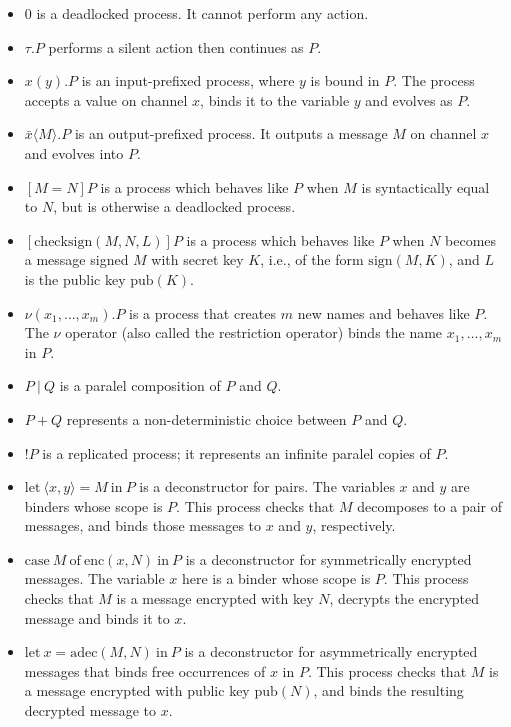 \documentclass{article}
\begin{document}
\begin{itemize}
\item $0$ is a deadlocked process. It cannot perform any action.
\item $\tau.P$ performs a silent action then continues as $P$.
\item $x(y).P$ is an input-prefixed process, where $y$ is bound in $P$.
The process accepts a value on channel $x$, binds it to the
variable $y$ and evolves as $P$.
\item $\bar x\langle M \rangle.P$ is an output-prefixed process. It outputs a message $M$ on channel $x$
and evolves into $P$.
\item $[M = N] P$ is a process which behaves like $P$ when $M$ is syntactically equal to $N$,
but is otherwise a deadlocked process.
\item $[\mathrm{checksign}(M, N, L)] P$ is a process which behaves like $P$ when $N$ becomes a message signed $M$
with secret key $K$, i.e., of the form $\mathrm{sign}(M, K)$, and $L$ is the public key $\mathrm{pub}(K)$.
\item $\nu (x_1,\ldots,x_m). P$ is a process that creates $m$ new names and behaves like $P$. 
The $\nu$ operator (also called the restriction operator) binds the name $x_1,\ldots, x_m$ in $P$. 
\item $P ~|~ Q$ is a paralel composition of $P$ and $Q$.
\item $P + Q$ represents a non-deterministic choice between $P$ and $Q$.
\item $!P$ is a replicated process; it represents an infinite paralel copies of $P$. 
\item $\mathrm{let}~ \langle x, y \rangle = M ~ \mathrm{ in } ~ P$
is a deconstructor for pairs. The variables $x$ and $y$
are binders whose scope is $P$. This process checks that $M$ decomposes to a pair of messages,
and binds those messages to $x$ and $y$, respectively. 
\item $\mathrm{case} ~ M ~ \mathrm{ of } ~ \mathrm{enc}(x,N) ~ \mathrm{ in } ~ P$
is a deconstructor for symmetrically encrypted messages.
The variable $x$ here is a binder whose scope is $P$.
This process checks that $M$ is a message encrypted with key $N$, decrypts the
encrypted message and binds it to $x.$
\item $\mathrm{let} ~ x = \mathrm{adec}(M,N) ~ \mathrm{ in } ~ P$ 
is a deconstructor for asymmetrically encrypted messages that
binds free occurrences of $x$ in $P$. 
This process checks that $M$ is a message encrypted with public key $\mathrm{pub}(N)$, and binds the
resulting decrypted message to $x$.
\end{itemize}
\end{document}
